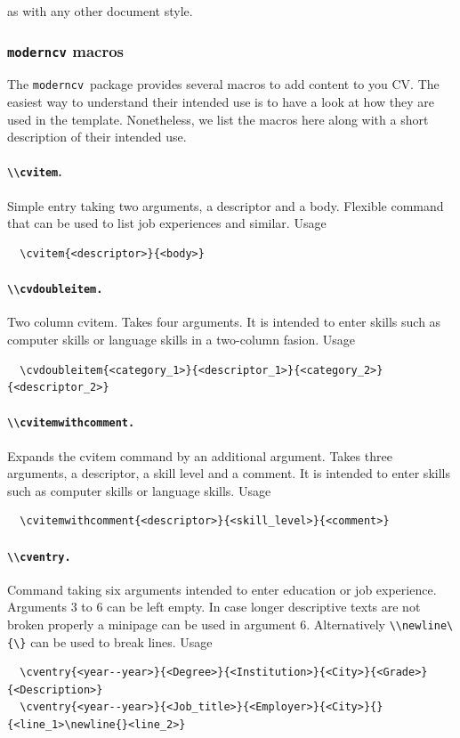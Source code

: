 \documentclass[a4paper,11pt]{article}
\newcommand{\code}[1]{\lstinline!#1!}
\newcommand{\Code}[1]{\lstinline!#1!~} %
\newcommand{\Moderncv}{\Code{moderncv}}
\begin{document}
as with any other document style.

\subsubsection{\texttt{moderncv} macros}

The \Moderncv package provides several macros to add content to you CV. The easiest way to understand their intended use is to have a look at how they are used in the template.
Nonetheless, we list the macros here along with a short description of their intended use.

\paragraph{\code{\\cvitem}.} Simple entry taking two arguments, a descriptor and a body. Flexible command that can be used to list job experiences and similar. Usage
\begin{lstlisting}
  \cvitem{<descriptor>}{<body>}
\end{lstlisting}

\paragraph{\code{\\cvdoubleitem.}} Two column cvitem. Takes four arguments. It is intended to enter skills such as computer skills or language skills in a two-column fasion. Usage
\begin{lstlisting}
  \cvdoubleitem{<category_1>}{<descriptor_1>}{<category_2>}{<descriptor_2>}
\end{lstlisting}

\paragraph{\code{\\cvitemwithcomment.}} Expands the cvitem command by an additional argument. Takes three arguments, a descriptor, a skill level  and a comment. It is intended to enter skills such as computer skills or language skills. Usage
\begin{lstlisting}
  \cvitemwithcomment{<descriptor>}{<skill_level>}{<comment>}
\end{lstlisting}

\paragraph{\code{\\cventry.}} Command taking six arguments intended to enter education or job experience.
Arguments 3 to 6 can be left empty. In case longer descriptive texts are not broken properly a minipage can be used in argument 6. Alternatively \code{\\newline\{\}} can be used to break lines.  Usage
\begin{lstlisting}
  \cventry{<year--year>}{<Degree>}{<Institution>}{<City>}{<Grade>}{<Description>}
  \cventry{<year--year>}{<Job_title>}{<Employer>}{<City>}{}{<line_1>\newline{}<line_2>}
\end{lstlisting}
\end{document}
